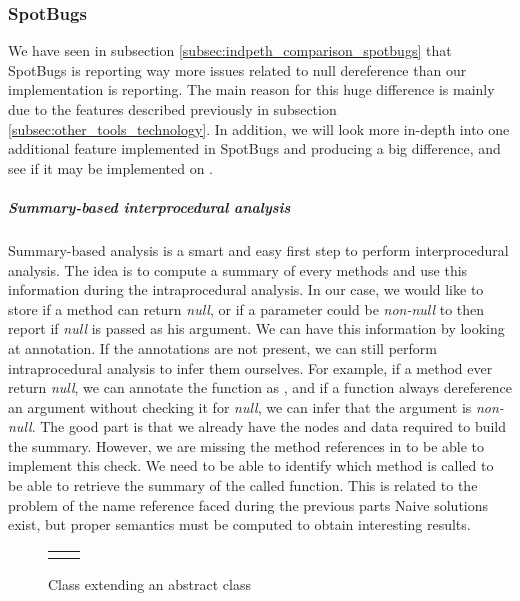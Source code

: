 \subsubsection{SpotBugs}
\label{subsec:spotbugs_specific}

We have seen in subsection \ref{subsec:indpeth_comparison_spotbugs} that SpotBugs is reporting way more issues related to null dereference than our implementation is reporting.
The main reason for this huge difference is mainly due to the features described previously in subsection \ref{subsec:other_tools_technology}.
In addition, we will look more in-depth into one additional feature implemented in SpotBugs and producing a big difference, and see if it may be implemented on \slang{}.

\subparagraph{Summary-based interprocedural analysis}
Summary-based analysis is a smart and easy first step to perform interprocedural analysis.
The idea is to compute a summary of every methods and use this information during the intraprocedural analysis. 
In our case, we would like to store if a method can return \emph{null}, or if a parameter could be \emph{non-null} to then report if \emph{null} is passed as his argument.
We can have this information by looking at annotation.
If the annotations are not present, we can still perform intraprocedural analysis to infer them ourselves. 
For example, if a method ever return \emph{null}, we can annotate the function as \nullable{}, and if a function always dereference an argument without checking it for \emph{null}, we can infer that the argument is \emph{non-null}. 
The good part is that we already have the nodes and data required to build the summary.
However, we are missing the method references in \slang{} to be able to implement this check.
We need to be able to identify which method is called to be able to retrieve the summary of the called function.
This is related to the problem of the name reference faced during the previous parts
Naive solutions exist, but proper semantics must be computed to obtain interesting results.

\begin{figure}[H]
	\centering
	\caption{Class extending an abstract class}
	\label{figure:class-extends-abtract}
	\setlength{\tabcolsep}{24pt}
	\begin{tabular}{cc}
		\multicolumn{1}{c}{} & \multicolumn{1}{c}{} \\
	\end{tabular}


\end{figure}

